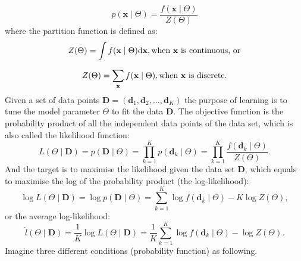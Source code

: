 \begin{equation}
p(\mathbf{x} \mid \Theta ) = \dfrac{f(\mathbf{x} \mid \Theta )}{Z( \Theta)}
\end{equation}
where the partition function is defined as:
\begin{equation}
\label{equ:z_int}
Z( \Theta) = \int f(\mathbf{x} \mid \Theta )\mathrm{d}\mathbf{x}, \text{when  $ \mathbf{x} $ is continuous, or}
\end{equation}

\begin{equation}
\label{equ:z_dis}
Z( \Theta) = \sum_{\mathbf{x}} f(\mathbf{x} \mid \Theta ), \text{when  $ \mathbf{x} $ is discrete.}
\end{equation}
Given a set of data points $ \mathbf{D}=(\mathbf{d}_1, \mathbf{d}_2, ..., \mathbf{d}_K) $ the purpose of learning is to tune the model parameter $ \Theta $ to fit the data $ \mathbf{D}  $. 
The objective function is the probability product of all the independent data points of the data set, which is also called the likelihood function:
\begin{equation}
L (\Theta \mid \mathbf{D}) = p(\mathbf{D} \mid \Theta ) = \prod_{k=1}^K p(\mathbf{d}_k \mid \Theta ) =  \prod_{k=1}^K\dfrac{f(\mathbf{d}_k \mid \Theta )}{Z( \Theta)}.
\end{equation}
And the target is to maximise the likelihood given the data set $ \mathbf{D}  $, which equals to maximise the log of the probability product (the log-likelihood):
\begin{equation}
\log  L (\Theta \mid \mathbf{D}) = \log p(\mathbf{D} \mid \Theta ) = \sum_{k=1}^K\log f(\mathbf{d}_k \mid \Theta ) - K \log Z( \Theta),
\end{equation}
or the average log-likelihood:
\begin{equation}
\label{equ:like}
\hat{l} (\Theta \mid \mathbf{D}) =\frac{1}{K}\log  L (\Theta \mid \mathbf{D}) 
=\frac{1}{K}\sum_{k=1}^K\log f(\mathbf{d}_k \mid \Theta ) - \log Z( \Theta).
\end{equation}
Imagine three different conditions (probability function) as following.

